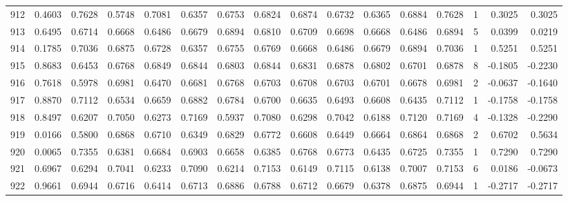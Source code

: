 \begin{tabular}{lrrrrrrrrrrrrrrr}
912 &      0.4603 &  0.7628 &  0.5748 &  0.7081 &  0.6357 &  0.6753 &  0.6824 &  0.6874 &  0.6732 &  0.6365 &   0.6884 &     0.7628 &      1 &                    0.3025 &                     0.3025 \\
913 &      0.6495 &  0.6714 &  0.6668 &  0.6486 &  0.6679 &  0.6894 &  0.6810 &  0.6709 &  0.6698 &  0.6668 &   0.6486 &     0.6894 &      5 &                    0.0399 &                     0.0219 \\
914 &      0.1785 &  0.7036 &  0.6875 &  0.6728 &  0.6357 &  0.6755 &  0.6769 &  0.6668 &  0.6486 &  0.6679 &   0.6894 &     0.7036 &      1 &                    0.5251 &                     0.5251 \\
915 &      0.8683 &  0.6453 &  0.6768 &  0.6849 &  0.6844 &  0.6803 &  0.6844 &  0.6831 &  0.6878 &  0.6802 &   0.6701 &     0.6878 &      8 &                   -0.1805 &                    -0.2230 \\
916 &      0.7618 &  0.5978 &  0.6981 &  0.6470 &  0.6681 &  0.6768 &  0.6703 &  0.6708 &  0.6703 &  0.6701 &   0.6678 &     0.6981 &      2 &                   -0.0637 &                    -0.1640 \\
917 &      0.8870 &  0.7112 &  0.6534 &  0.6659 &  0.6882 &  0.6784 &  0.6700 &  0.6635 &  0.6493 &  0.6608 &   0.6435 &     0.7112 &      1 &                   -0.1758 &                    -0.1758 \\
918 &      0.8497 &  0.6207 &  0.7050 &  0.6273 &  0.7169 &  0.5937 &  0.7080 &  0.6298 &  0.7042 &  0.6188 &   0.7120 &     0.7169 &      4 &                   -0.1328 &                    -0.2290 \\
919 &      0.0166 &  0.5800 &  0.6868 &  0.6710 &  0.6349 &  0.6829 &  0.6772 &  0.6608 &  0.6449 &  0.6664 &   0.6864 &     0.6868 &      2 &                    0.6702 &                     0.5634 \\
920 &      0.0065 &  0.7355 &  0.6381 &  0.6684 &  0.6903 &  0.6658 &  0.6385 &  0.6768 &  0.6773 &  0.6435 &   0.6725 &     0.7355 &      1 &                    0.7290 &                     0.7290 \\
921 &      0.6967 &  0.6294 &  0.7041 &  0.6233 &  0.7090 &  0.6214 &  0.7153 &  0.6149 &  0.7115 &  0.6138 &   0.7007 &     0.7153 &      6 &                    0.0186 &                    -0.0673 \\
922 &      0.9661 &  0.6944 &  0.6716 &  0.6414 &  0.6713 &  0.6886 &  0.6788 &  0.6712 &  0.6679 &  0.6378 &   0.6875 &     0.6944 &      1 &                   -0.2717 &                    -0.2717 \\

\end{tabular}
